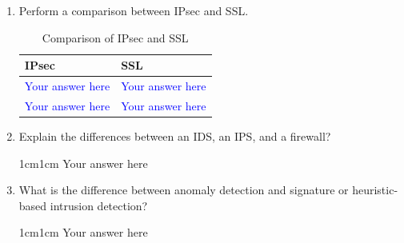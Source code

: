 \documentclass[11pt,letterpaper]{article}
\newenvironment{answer}{\em \color{blue} \begin{adjustwidth}{1cm}{1cm}}{\end{adjustwidth}}
\begin{document}
\begin{enumerate}
		\item Perform a comparison between IPsec and SSL.
		
		\begin{table}[htbp]
			\caption{Comparison of IPsec and SSL}
			\begin{tabularx}{\columnwidth}{|X|X|}
				\hline
				\textbf{IPsec} & \textbf{SSL}\\
				\hline
				\textcolor{blue}{Your answer here} & 
				\textcolor{blue}{Your answer here} \\ 
				\hline 
				\textcolor{blue}{Your answer here} & 
				\textcolor{blue}{Your answer here} \\ 
				\hline 
				
				
			\end{tabularx}
		\end{table}
		
		\item Explain the differences between an IDS, an IPS, and a firewall?
		
		\begin{answer}
			Your answer here
		\end{answer}
		
		\item What is the difference between anomaly detection and signature or heuristic-based intrusion detection?
		
		\begin{answer}
			Your answer here
		\end{answer}
		
	\end{enumerate}
	
\end{document}
